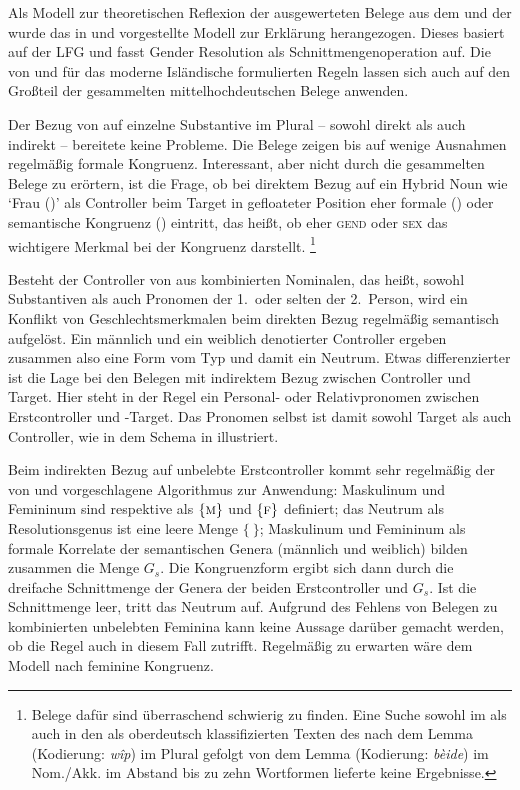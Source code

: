 Als Modell zur theoretischen Reflexion der ausgewerteten Belege aus dem
\CAO{} und der \KC{} wurde das in \citet{wechsler2009} und
\citet{wechslerzlatic2003} vorgestellte Modell zur Erklärung herangezogen.
Dieses basiert auf der LFG und fasst Gender Resolution als
Schnittmengenoperation auf. Die von \citet[578]{wechsler2009} und
\citet[186]{wechslerzlatic2003} für das moderne Isländische formulierten Regeln
lassen sich auch auf den Großteil der gesammelten
mittelhochdeutschen Belege anwenden.

Der Bezug von  auf einzelne Substantive im Plural -- sowohl direkt
als auch indirekt -- bereitete keine Probleme. Die Belege zeigen bis auf wenige
Ausnahmen regelmäßig formale Kongruenz. Interessant, aber nicht durch die
gesammelten Belege zu erörtern, ist die Frage, ob bei direktem Bezug auf ein
Hybrid Noun wie  `Frau (\NeutF)' als Controller beim Target in
gefloateter Position eher formale () oder semantische Kongruenz
() eintritt, das heißt, ob eher \textsc{gend} oder \textsc{sex} das
wichtigere Merkmal bei der Kongruenz darstellt.%
%
	\footnote{Belege dafür sind überraschend schwierig zu finden. Eine Suche
		sowohl im \CAO{} als auch in den als oberdeutsch klassifizierten Texten
		des \REM{} nach dem Lemma  (Kodierung: \emph{wîp}) im
		Plural gefolgt von dem Lemma  (Kodierung: \emph{bèide})
		im Nom./Akk. im Abstand bis zu zehn Wortformen lieferte keine
		Ergebnisse.}

Besteht der Controller von  aus kombinierten Nominalen, das heißt,
sowohl Substantiven als auch Pronomen der 1.\ oder selten der 2.\ Person, wird
ein Konflikt von Geschlechtsmerkmalen beim direkten Bezug regelmäßig semantisch
aufgelöst. Ein männlich und ein weiblich denotierter Controller ergeben
zusammen also eine Form vom Typ  und damit ein Neutrum. Etwas
differenzierter ist die Lage bei den Belegen mit indirektem Bezug zwischen
Controller und Target. Hier steht in der Regel ein Personal- oder
Relativpronomen zwischen Erstcontroller und -Target. Das Pronomen
selbst ist damit sowohl Target als auch Controller, wie in dem Schema in
 illustriert.

Beim indirekten Bezug auf unbelebte Erstcontroller kommt sehr regelmäßig der
von \citet[577]{wechsler2009} und \citet[184]{wechslerzlatic2003}
vorgeschlagene Algorithmus zur Anwendung: Maskulinum und Femininum sind
respektive als $\{\textsc{m}\}$ und $\{\textsc{f}\}$ definiert; das Neutrum als
Resolutionsgenus ist eine leere Menge $\{\ \}$; Maskulinum und Femininum als
formale Korrelate der semantischen Genera (männlich und weiblich) bilden
zusammen die Menge $G_s$. Die Kongruenzform ergibt sich dann durch die
dreifache Schnittmenge der Genera der beiden Erstcontroller und $G_s$. Ist die
Schnittmenge leer, tritt das Neutrum auf. Aufgrund des Fehlens von Belegen zu
kombinierten unbelebten Feminina kann keine Aussage darüber gemacht werden, ob
die Regel auch in diesem Fall zutrifft. Regelmäßig zu erwarten wäre dem Modell
nach feminine Kongruenz.


